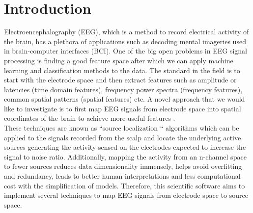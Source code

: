 \documentclass[12pt]{article}
\begin{document}
%
%
%

\section{Introduction}
Electroencephalography (EEG), which is a method to record electrical activity of the brain, has a plethora of applications such as decoding mental imageries used in brain-computer interfaces (BCI). One of the big open problems in EEG signal processing is finding a good feature space after which we can apply machine learning and classification methods to the data. The standard in the field is to start with the electrode space and then extract features such as amplitude or latencies (time domain features), frequency power spectra (frequency features), common spatial patterns (spatial features) etc. A novel approach that we would like to investigate is to first map EEG signals from electrode space into spatial coordinates of the brain to achieve more useful features \cite{michel_eeg_2019}.\\

These techniques are known as “source localization “ algorithms which can be applied to the signals recorded from the scalp and locate the underlying active sources generating the activity sensed on the electrodes expected to increase the signal to noise ratio. Additionally, mapping the activity from an n-channel space to fewer sources reduces data dimensionality immensely, helps avoid overfitting and redundancy, leads to better human interpretations and less computational cost with the simplification of models. Therefore, this scientific software aims to implement several techniques to map EEG signals from electrode space to source space.\\
\end{document}

